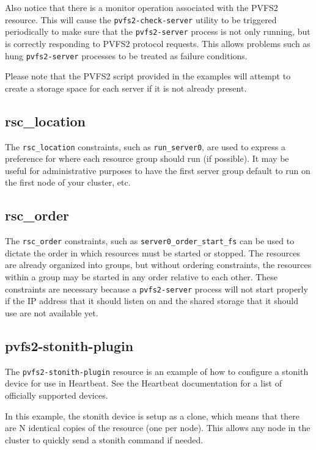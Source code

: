 \documentclass[11pt]{article}
\begin{document}
Also notice that there is a monitor operation associated with the PVFS2
resource.  This will cause the \texttt{pvfs2-check-server} utility to be triggered
periodically to make sure that the \texttt{pvfs2-server} process is not only
running, but is correctly responding to PVFS2 protocol requests.  This
allows problems such as hung \texttt{pvfs2-server} processes to be treated as
failure conditions.

Please note that the PVFS2 script provided in the examples will attempt
to create a storage space for each server if it is not already present.

\subsection{rsc\_location}

The \texttt{rsc\_location} constraints, such as \texttt{run\_server0},
are used to express a preference for where each resource group should
run (if possible).  It may be useful for administrative purposes to have
the first server group default to run on the first node of your cluster,
etc.

\subsection{rsc\_order}

The \texttt{rsc\_order} constraints, such as
\texttt{server0\_order\_start\_fs} can be used to dictate the order in
which resources must be started or stopped.  The resources are already
organized into groups, but without ordering constraints, the resources
within a group may be started in any order relative to each other.
These constraints are necessary because a \texttt{pvfs2-server} process will not
start properly if the IP address that it should listen on and the shared
storage that it should use are not available yet.

\subsection{pvfs2-stonith-plugin}

The \texttt{pvfs2-stonith-plugin} resource is an example of how to
configure a stonith device for use in Heartbeat.  See the Heartbeat
documentation for a list of officially supported devices.

In this example, the stonith device is setup as a clone, which means
that there are N identical copies of the resource (one per node).  This
allows any node in the cluster to quickly send a stonith command if
needed.
\end{document}
